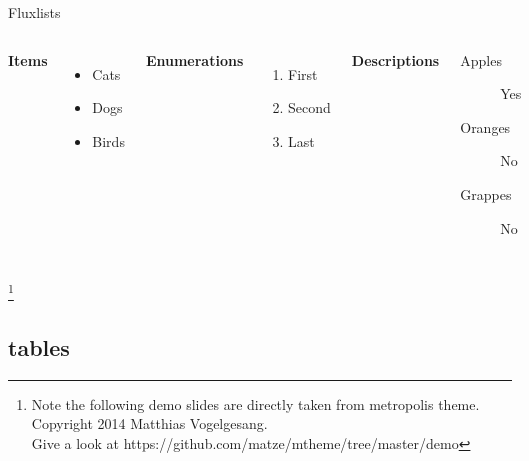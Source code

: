 \documentclass[9pt]{beamer}
\begin{document}
\begin{frame}{Flux}{lists}
   \begin{columns}[T,onlytextwidth]
      \textbf{Items}
      \begin{itemize}
        \item Cats \item Dogs \item Birds
      \end{itemize}

      \textbf{Enumerations}
      \begin{enumerate}
        \item First \item Second \item Last
      \end{enumerate}

      \textbf{Descriptions}
      \begin{description}
        \item[Apples] Yes \item[Oranges] No \item[Grappes] No
      \end{description}
\end{columns}
\let\thefootnote\relax\footnote{Note the following demo slides are directly taken from metropolis theme. Copyright 2014 Matthias Vogelgesang.\\
Give a look at https://github.com/matze/mtheme/tree/master/demo}
\end{frame}

\subsection{tables}
\end{document}
